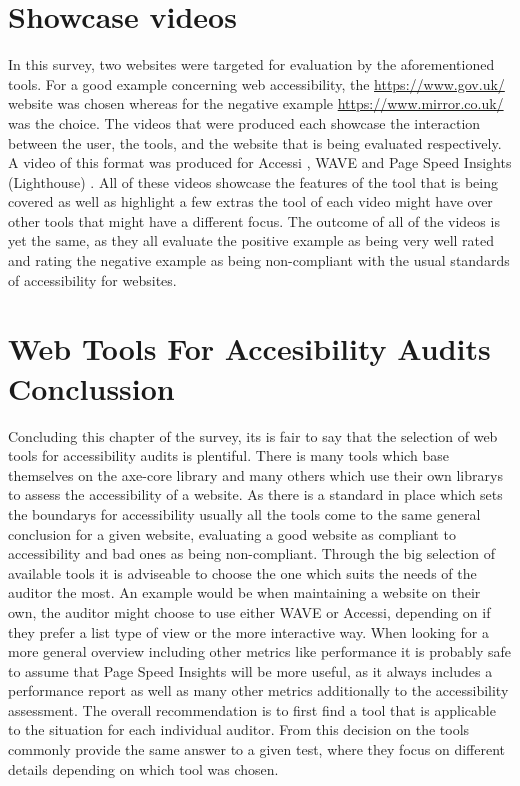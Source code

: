 \section{Showcase videos}
In this survey, two websites were targeted for evaluation by the aforementioned tools. For a good example concerning web accessibility, the \url{https://www.gov.uk/} website was chosen whereas for the negative example \url{https://www.mirror.co.uk/} was the choice. The videos that were produced each showcase the interaction between the user, the tools, and the website that is being evaluated respectively. A video of this format was produced for Accessi \parencite{Accessi_vid}, WAVE \parencite{WAVE_vid} and Page Speed Insights (Lighthouse) \parencite{PageSpeedInsights_vid}. All of these videos showcase the features of the tool that is being covered as well as highlight a few extras the tool of each video might have over other tools that might have a different focus. The outcome of all of the videos is yet the same, as they all evaluate the positive example as being very well rated and rating the negative example as being non-compliant with the usual standards of accessibility for websites.

\section{Web Tools For Accesibility Audits Conclussion}

Concluding this chapter of the survey, its is fair to say that the selection of web tools for accessibility audits is plentiful. There is many tools which base themselves on the axe-core library and many others which use their own librarys to assess the accessibility of a website. As there is a standard in place which sets the boundarys for accessibility usually all the tools come to the same general conclusion for a given website, evaluating a good website as compliant to accessibility and bad ones as being non-compliant. Through the big selection of available tools it is adviseable to choose the one which suits the needs of the auditor the most. An example would be when maintaining a website on their own, the auditor might choose to use either WAVE or Accessi, depending on if they prefer a list type of view or the more interactive way. When looking for a more general overview including other metrics like performance it is probably safe to assume that Page Speed Insights will be more useful, as it always includes a performance report as well as many other metrics additionally to the accessibility assessment. The overall recommendation is to first find a tool that is applicable to the situation for each individual auditor. From this decision on the tools commonly provide the same answer to a given test, where they focus on different details depending on which tool was chosen.


